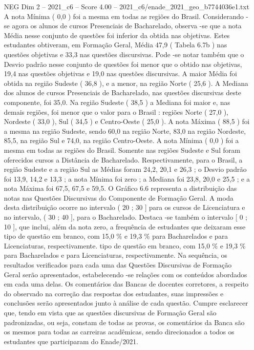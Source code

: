 \begin{textsample}{NEG Dim 2 – 2021\_c6 – Score 4.00 – 2021\_c6/enade\_2021\_geo\_b7744036e1.txt}
A nota Mínima ( 0,0 ) foi a mesma em todas as regiões do Brasil.
Considerando -se agora os alunos de cursos Presenciais de Bacharelado, observa -se que a nota Média nesse conjunto de questões foi inferior da obtida nas objetivas.
Estes estudantes obtiveram, em Formação Geral, Média 47,9 ( Tabela 6.7b ) nas questões objetivas e 33,3 nas questões discursivas.
Pode -se notar também que o Desvio padrão nesse conjunto de questões foi menor que o obtido nas objetivas, 19,4 nas questões objetivas e 19,0 nas questões discursivas.
A maior Média foi obtida na região Sudeste ( 36,8 ), e a menor, na região Norte ( 25,6 ).
A Mediana dos alunos de cursos Presenciais de Bacharelado, nas questões discursivas deste componente, foi 35,0.
Na região Sudeste ( 38,5 ) a Mediana foi maior e, nas demais regiões, foi menor que o valor para o Brasil : regiões Norte ( 27,0 ), Nordeste ( 33,0 ), Sul ( 34,5 ) e Centro-Oeste ( 25,0 ).
A nota Máxima ( 88,5 ) foi a mesma na região Sudeste, sendo 60,0 na região Norte, 83,0 na região Nordeste, 85,5, na região Sul e 74,0, na região Centro-Oeste.
A nota Mínima ( 0,0 ) foi a mesma em todas as regiões do Brasil.
Somente nas regiões Sudeste e Sul foram oferecidos cursos a Distância de Bacharelado.
Respectivamente, para o Brasil, a região Sudeste e a região Sul as Médias foram 24,2, 20,1 e 26,3 ; o Desvio padrão foi 13,9, 14,2 e 13,3 ; a nota Mínima foi zero ; a Mediana foi 23,8, 20,0 e 25,5 ; e a nota Máxima foi 67,5, 67,5 e 59,5.
O Gráfico 6.6 representa a distribuição das notas nas Questões Discursivas do Componente de Formação Geral.
A moda desta distribuição ocorre no intervalo ( 20 ; 30 ] para os cursos de Licenciatura e no intervalo, ( 30 ; 40 ], para o Bacharelado.
Destaca -se também o intervalo [ 0 ; 10 ], que inclui, além da nota zero, a frequência de estudantes que deixaram esse tipo de questão em branco, com 15,0 \% e 19,3 \% para Bacharelados e para Licenciaturas, respectivamente. tipo de questão em branco, com 15,0 \% e 19,3 \% para Bacharelados e para Licenciaturas, respectivamente.
Na sequência, os resultados verificados para cada uma das Questões Discursivas de Formação Geral serão apresentados, estabelecendo -se relações com os conteúdos abordados em cada uma delas.
Os comentários das Bancas de docentes corretores, a respeito do observado na correção das respostas dos estudantes, suas impressões e conclusões serão apresentados junto à análise de cada questão.
Cumpre esclarecer que, tendo em vista que as questões discursivas de Formação Geral são padronizadas, ou seja, constam de todas as provas, os comentários da Banca são os mesmos para todas as carreiras acadêmicas, sendo direcionados a todos os estudantes que participaram do Enade/2021.

\end{textsample}
